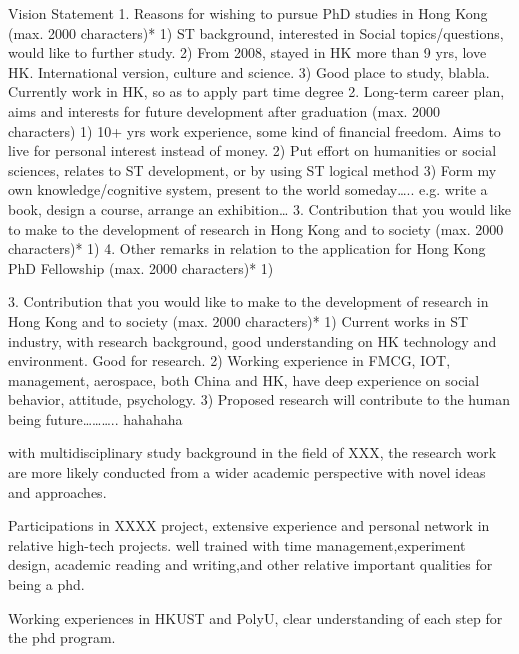 \newpage
Vision Statement 
1.     Reasons for wishing to pursue PhD studies in Hong Kong (max. 2000 characters)*
1)      ST background, interested in Social topics/questions, would like to further study.
2)      From 2008, stayed in HK more than 9 yrs, love HK. International version, culture and science. 
3)      Good place to study, blabla. Currently work in HK, so as to apply part time degree
2.     Long-term career plan, aims and interests for future development after graduation (max. 2000 characters)
1)      10+ yrs work experience, some kind of financial freedom. Aims to live for personal interest instead of money.
2)      Put effort on humanities or social sciences, relates to ST development, or by using ST logical method
3)      Form my own knowledge/cognitive system, present to the world someday….. e.g. write a book, design a course, arrange an exhibition…
3.     Contribution that you would like to make to the development of research in Hong Kong and to society (max. 2000 characters)*
1)       
4.     Other remarks in relation to the application for Hong Kong PhD Fellowship (max. 2000 characters)*
1)       

3.      Contribution that you would like to make to the development of research in Hong Kong and to society (max. 2000 characters)*
1)      Current works in ST industry, with research background, good understanding on HK technology and environment.  Good for research.
2)      Working experience in FMCG, IOT, management, aerospace, both China and HK,  have deep experience on social behavior, attitude, psychology. 
3)      Proposed research will contribute to the human being future……….. hahahaha


with multidisciplinary study background in the field of XXX, the research work are more likely conducted from a wider academic perspective with novel ideas and approaches. 

Participations in XXXX  project, extensive experience and personal network in relative high-tech projects. well trained with time management,experiment design, academic reading and writing,and other relative important qualities for being a phd.  

Working experiences in HKUST and PolyU, clear understanding of each step for the phd program. 